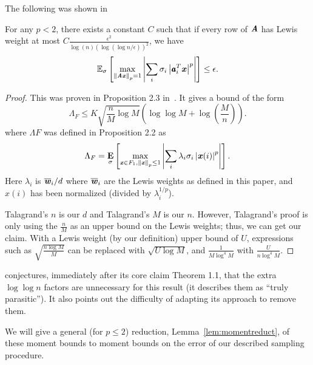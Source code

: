 The following was shown in~\cite{TalagrandLp}
\begin{lemma}
For any $p < 2$, there exists a constant $C$ such that if every row of $\AA$ has
Lewis weight at most
$C \frac{\epsilon^2}{\log (n) (\log (\log n / \epsilon))^2}$, we have
\begin{equation*}
\expec{\sigma}{\max_{\norm{\AA \xx}_p = 1}
\left | \sum_i \sigma_i \left|\aa_i^T \xx \right|^p \right|} \leq \epsilon.
\end{equation*}
\end{lemma}

\begin{proof}
This was proven in Proposition 2.3 in~\cite{TalagrandLp}.
It gives a bound of the form
\begin{equation*}
\Lambda_{F} \leq K \sqrt{ \frac{n}{M} \log{M} } \left( \log\log{M} + \log \left( \frac{M}{n} \right) \right).
\end{equation*}
where $\Lambda{F}$ was defined in Proposition 2.2 as
\begin{equation*}
\Lambda_{F} 
= \expct{\sigma} {\max_{\xx \in F_1, \norm{\xx}_p \leq 1}
\left | \sum_i \lambda_i \sigma_i \left| \xx(i) \right|^p \right|}.
\end{equation*}
Here $\lambda_i$ is $\wwbar_i / d$ where $\wwbar_i$ are the Lewis weights as defined in this paper, and $x(i)$
has been normalized (divided by $\lambda_i^{1/p}$).

Talagrand's $n$ is our $d$ and Talagrand's $M$ is our $n$.
However, Talagrand's proof is only using the $\frac{n}{M}$ as an upper bound on the Lewis weights;
thus, we can get our claim.  With a Lewis weight (by our definition) upper bound of $U$, expressions such as
$\sqrt{\frac{n \log M}{M}}$ can be replaced with $\sqrt{U \log M}$, and $\frac{1}{M \log^4 M}$ with
$\frac{U}{n \log^4 M}$.
\end{proof}
\cite{TalagrandLp} conjectures, immediately after its core claim Theorem 1.1,
that the extra $\log \log n$ factors are unnecessary for this result
(it describes them as ``truly parasitic'').  It also points out the difficulty of adapting its approach to remove them.

We will give a general (for $p \leq 2$) reduction, Lemma~\ref{lem:momentreduct}, of these moment bounds to moment bounds on the error of our described sampling procedure.


